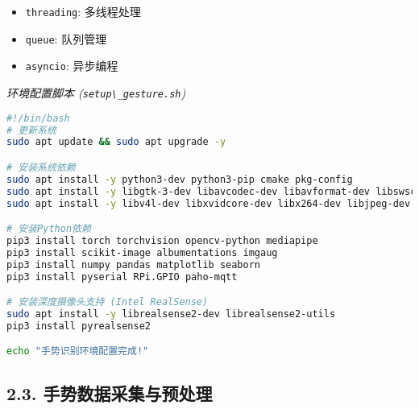 \begin{itemize}
  \begin{itemize}
  \tightlist
  \item
    \passthrough{\lstinline!threading!}: 多线程处理
  \item
    \passthrough{\lstinline!queue!}: 队列管理
  \item
    \passthrough{\lstinline!asyncio!}: 异步编程
  \end{itemize}
\end{itemize}

\emph{环境配置脚本 (\passthrough{\lstinline!setup\_gesture.sh!})}

\begin{lstlisting}[language=bash]
#!/bin/bash
# 更新系统
sudo apt update && sudo apt upgrade -y

# 安装系统依赖
sudo apt install -y python3-dev python3-pip cmake pkg-config
sudo apt install -y libgtk-3-dev libavcodec-dev libavformat-dev libswscale-dev
sudo apt install -y libv4l-dev libxvidcore-dev libx264-dev libjpeg-dev libpng-dev libtiff-dev

# 安装Python依赖
pip3 install torch torchvision opencv-python mediapipe
pip3 install scikit-image albumentations imgaug
pip3 install numpy pandas matplotlib seaborn
pip3 install pyserial RPi.GPIO paho-mqtt

# 安装深度摄像头支持 (Intel RealSense)
sudo apt install -y librealsense2-dev librealsense2-utils
pip3 install pyrealsense2

echo "手势识别环境配置完成!"
\end{lstlisting}

\subsection{2.3.
手势数据采集与预处理}\label{ux624bux52bfux6570ux636eux91c7ux96c6ux4e0eux9884ux5904ux7406}

